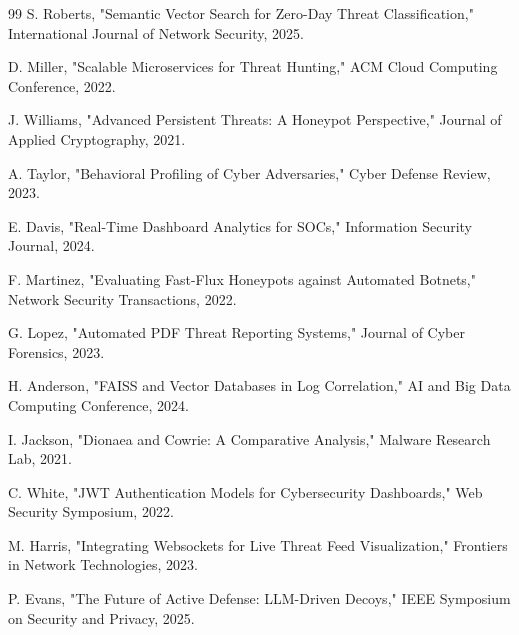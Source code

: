 \documentclass[12pt,a4paper]{report}
\begin{document}
\begin{thebibliography}{99}
S. Roberts,
"Semantic Vector Search for Zero-Day Threat Classification,"
International Journal of Network Security, 2025.

D. Miller,
"Scalable Microservices for Threat Hunting,"
ACM Cloud Computing Conference, 2022.

J. Williams,
"Advanced Persistent Threats: A Honeypot Perspective,"
Journal of Applied Cryptography, 2021.

A. Taylor,
"Behavioral Profiling of Cyber Adversaries,"
Cyber Defense Review, 2023.

E. Davis,
"Real-Time Dashboard Analytics for SOCs,"
Information Security Journal, 2024.

F. Martinez,
"Evaluating Fast-Flux Honeypots against Automated Botnets,"
Network Security Transactions, 2022.

G. Lopez,
"Automated PDF Threat Reporting Systems,"
Journal of Cyber Forensics, 2023.

H. Anderson,
"FAISS and Vector Databases in Log Correlation,"
AI and Big Data Computing Conference, 2024.

I. Jackson,
"Dionaea and Cowrie: A Comparative Analysis,"
Malware Research Lab, 2021.

C. White,
"JWT Authentication Models for Cybersecurity Dashboards,"
Web Security Symposium, 2022.

M. Harris,
"Integrating Websockets for Live Threat Feed Visualization,"
Frontiers in Network Technologies, 2023.

P. Evans,
"The Future of Active Defense: LLM-Driven Decoys,"
IEEE Symposium on Security and Privacy, 2025.

\end{thebibliography}

\end{document}
